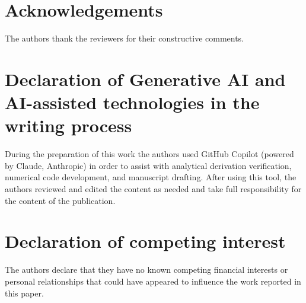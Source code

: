 \documentclass[review]{elsarticle}
\begin{document}
\section*{Acknowledgements}
The authors thank the reviewers for their constructive comments.

\section*{Declaration of Generative AI and AI-assisted technologies in the writing process}
During the preparation of this work the authors used GitHub Copilot
(powered by Claude, Anthropic) in order to assist with analytical
derivation verification, numerical code development, and manuscript
drafting.  After using this tool, the authors reviewed and edited the
content as needed and take full responsibility for the content of the
publication.

\section*{Declaration of competing interest}
The authors declare that they have no known competing financial interests
or personal relationships that could have appeared to influence the work
reported in this paper.
\end{document}
